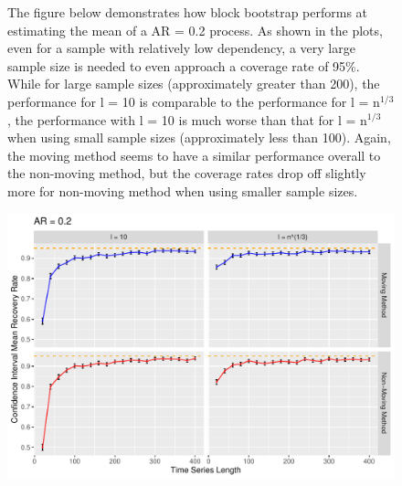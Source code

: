 \documentclass[12pt, letterpaper, titlepage]{article}
\begin{document}
\begin{figure}[tbp]
\caption{The figure below demonstrates how block bootstrap performs at estimating the mean of a AR = 0.2 process. As shown in the plots, even for a sample with relatively low dependency, a very large sample size is needed to even approach a coverage rate of 95\%.  While for large sample sizes (approximately greater than 200), the performance for l = 10 is comparable to the performance for l = n$^{1/3}$, the performance with l = 10 is much worse than that for l = n$^{1/3}$ when using small sample sizes (approximately less than 100). Again, the moving method seems to have a similar performance overall to the non-moving method, but the coverage rates drop off slightly more for non-moving method when using smaller sample sizes.}
  \centering
  \includegraphics[width=\textwidth]{ar_0.2}
  \caption{}
  \label{fig:ar_0.2}
\end{figure}
\end{document}
